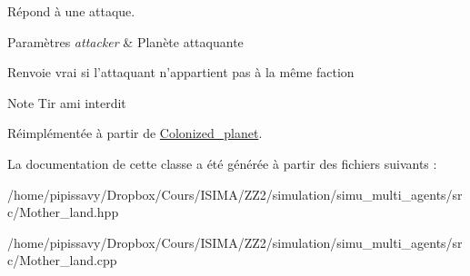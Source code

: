 Répond à une attaque. 


\begin{DoxyParams}{Paramètres}
{\em attacker} & Planète attaquante \\
\hline
\end{DoxyParams}
\begin{DoxyReturn}{Renvoie}
vrai si l'attaquant n'appartient pas à la même faction
\end{DoxyReturn}
\begin{DoxyNote}{Note}
Tir ami interdit 
\end{DoxyNote}


Réimplémentée à partir de \hyperlink{classColonized__planet_af637772fb84e45bb47447c88aa8d3f4a}{Colonized\-\_\-planet}.



La documentation de cette classe a été générée à partir des fichiers suivants \-:\begin{DoxyCompactItemize}
\item 
/home/pipissavy/\-Dropbox/\-Cours/\-I\-S\-I\-M\-A/\-Z\-Z2/simulation/simu\-\_\-multi\-\_\-agents/src/Mother\-\_\-land.\-hpp\item 
/home/pipissavy/\-Dropbox/\-Cours/\-I\-S\-I\-M\-A/\-Z\-Z2/simulation/simu\-\_\-multi\-\_\-agents/src/Mother\-\_\-land.\-cpp\end{DoxyCompactItemize}
